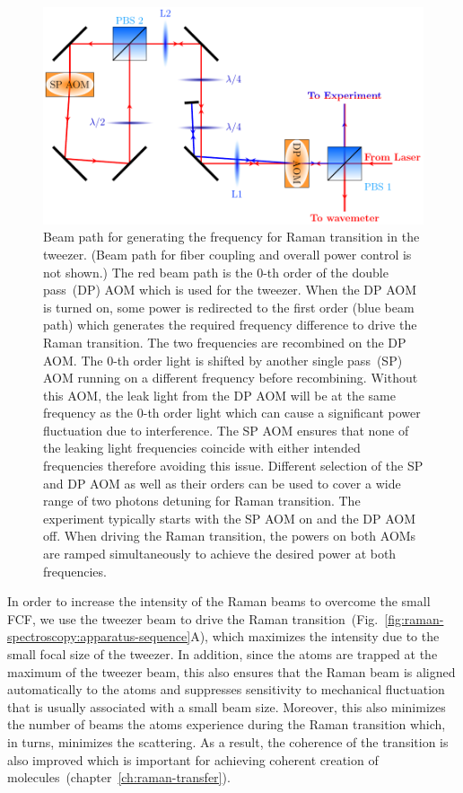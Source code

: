 \begin{figure}
  \centering
  \includegraphics[width=\textwidth]{figures/raman_spectroscopy_raman_beampath.pdf}
  \caption[Beam path to allow driving Raman transition with tweezer]{
    Beam path for generating the frequency for Raman transition in the tweezer.
    (Beam path for fiber coupling and overall power control is not shown.)
    The red beam path is the $0$-th order of the double pass~(DP) AOM
    which is used for the tweezer.
    When the DP AOM is turned on, some power is redirected to the first order
    (blue beam path) which generates the required frequency difference to drive
    the Raman transition. The two frequencies are recombined on the DP AOM.
    The $0$-th order light is shifted by another single pass~(SP) AOM
    running on a different frequency before recombining.
    Without this AOM, the leak light from the DP AOM will be at the same frequency
    as the $0$-th order light which can cause a significant power fluctuation
    due to interference. The SP AOM ensures that none of the leaking light frequencies
    coincide with either intended frequencies therefore avoiding this issue.
    Different selection of the SP and DP AOM as well as their orders can be used
    to cover a wide range of two photons detuning for Raman transition.
    The experiment typically starts with the SP AOM on and the DP AOM off.
    When driving the Raman transition, the powers on both AOMs are ramped simultaneously
    to achieve the desired power at both frequencies.
    \label{fig:raman-spectroscopy:raman-beampath}}
\end{figure}

In order to increase the intensity of the Raman beams to overcome the small FCF,
we use the tweezer beam to drive
the Raman transition~(Fig.~\ref{fig:raman-spectroscopy:apparatus-sequence}A),
which maximizes the intensity due to the small focal size of the tweezer.
In addition, since the atoms are trapped at the maximum of the tweezer beam,
this also ensures that the Raman beam is aligned automatically to the atoms
and suppresses sensitivity to mechanical fluctuation that is usually
associated with a small beam size.
Moreover, this also minimizes the number of beams the atoms experience
during the Raman transition which, in turns, minimizes the scattering.
As a result, the coherence of the transition is also improved
which is important for achieving
coherent creation of molecules~(chapter~\ref{ch:raman-transfer}).

